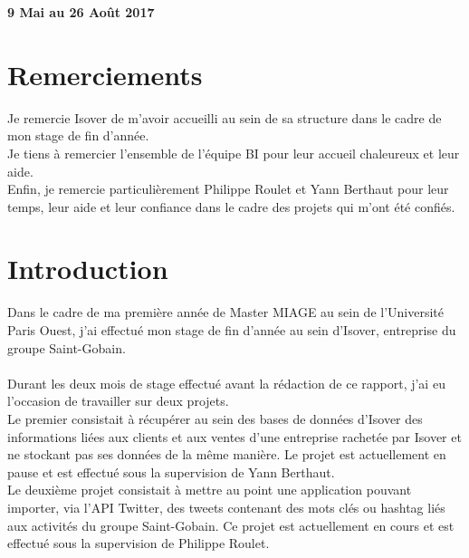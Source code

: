 \documentclass[a4paper,12pt]{article}
\begin{document}
\begin{titlepage}
\begin{flushleft}
\begin{center}
			\end{center}
		\end{flushleft}
	
		\begin{center}
			\vspace{0.1cm} \textbf{9 Mai au 26 Août 2017}
		\end{center}
		
	\newpage



\thispagestyle{empty}
\section*{Remerciements}
Je remercie Isover de m'avoir accueilli au sein de sa structure dans le cadre de mon stage de fin d'année. \\
\indent Je tiens à remercier l'ensemble de l'équipe BI pour leur accueil chaleureux et leur aide. \\
\indent Enfin, je remercie particulièrement Philippe Roulet et Yann Berthaut pour leur temps, leur aide et leur confiance dans le cadre des projets qui m'ont été confiés.

\newpage
\tableofcontents
\thispagestyle{empty}
\end{titlepage}
\newpage


\section*{Introduction}
Dans le cadre de ma première année de Master MIAGE au sein de l'Université Paris Ouest, j'ai effectué mon stage de fin d'année au sein d'Isover, entreprise du groupe Saint-Gobain.\\ \\

Durant les deux mois de stage effectué avant la rédaction de ce rapport, j'ai eu l'occasion de travailler sur deux projets. \\
\indent Le premier consistait à récupérer au sein des bases de données d'Isover des informations liées aux clients et aux ventes d'une entreprise rachetée par Isover et ne stockant pas ses données de la même manière. Le projet est actuellement en pause et est effectué sous la supervision de Yann Berthaut.\\ 
\indent Le deuxième projet consistait à mettre au point une application pouvant importer, via l'API Twitter, des tweets contenant des mots clés ou hashtag liés aux activités du groupe Saint-Gobain. Ce projet est actuellement en cours et est effectué sous la supervision de Philippe Roulet.\\ \\
\end{document}

